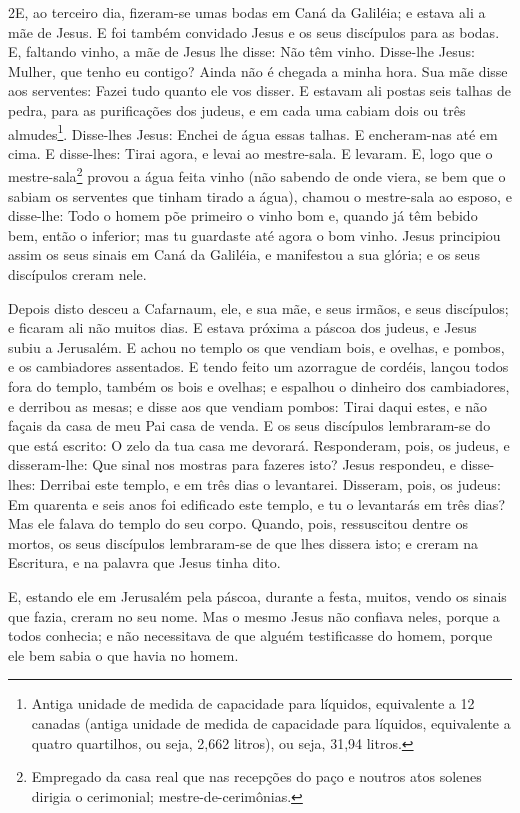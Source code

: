 \lettrine{2} E, ao terceiro dia, fizeram-se umas bodas em Caná
da Galiléia; e estava ali a mãe de Jesus. E foi também convidado
Jesus e os seus discípulos para as bodas. E, faltando vinho, a
mãe de Jesus lhe disse: Não têm vinho. Disse-lhe Jesus: Mulher,
que tenho eu contigo? Ainda não é chegada a minha hora. Sua mãe
disse aos serventes: Fazei tudo quanto ele vos disser. E estavam
ali postas seis talhas de pedra, para as purificações dos judeus, e
em cada uma cabiam dois ou três almudes\footnote{Antiga unidade de
medida de capacidade para líquidos, equivalente a 12 canadas (antiga
unidade de medida de capacidade para líquidos, equivalente a quatro
quartilhos, ou seja, 2,662 litros), ou seja, 31,94 litros.}.
Disse-lhes Jesus: Enchei de água essas talhas. E encheram-nas
até em cima. E disse-lhes: Tirai agora, e levai ao mestre-sala.
E levaram. E, logo que o mestre-sala\footnote{Empregado da casa
real que nas recepções do paço e noutros atos solenes dirigia o
cerimonial; mestre-de-cerimônias.} provou a água feita vinho (não
sabendo de onde viera, se bem que o sabiam os serventes que tinham
tirado a água), chamou o mestre-sala ao esposo, e disse-lhe:
Todo o homem põe primeiro o vinho bom e, quando já têm bebido bem,
então o inferior; mas tu guardaste até agora o bom vinho.
Jesus principiou assim os seus sinais em Caná da Galiléia, e
manifestou a sua glória; e os seus discípulos creram nele.

Depois disto desceu a Cafarnaum, ele, e sua mãe, e seus irmãos, e
seus discípulos; e ficaram ali não muitos dias. E estava
próxima a páscoa dos judeus, e Jesus subiu a Jerusalém. E
achou no templo os que vendiam bois, e ovelhas, e pombos, e os
cambiadores assentados. E tendo feito um azorrague de
cordéis, lançou todos fora do templo, também os bois e ovelhas; e
espalhou o dinheiro dos cambiadores, e derribou as mesas; e
disse aos que vendiam pombos: Tirai daqui estes, e não façais da
casa de meu Pai casa de venda. E os seus discípulos
lembraram-se do que está escrito: O zelo da tua casa me devorará.
Responderam, pois, os judeus, e disseram-lhe: Que sinal nos
mostras para fazeres isto? Jesus respondeu, e disse-lhes:
Derribai este templo, e em três dias o levantarei. Disseram,
pois, os judeus: Em quarenta e seis anos foi edificado este templo,
e tu o levantarás em três dias? Mas ele falava do templo do
seu corpo. Quando, pois, ressuscitou dentre os mortos, os
seus discípulos lembraram-se de que lhes dissera isto; e creram na
Escritura, e na palavra que Jesus tinha dito.

E, estando ele em Jerusalém pela páscoa, durante a festa, muitos,
vendo os sinais que fazia, creram no seu nome. Mas o mesmo
Jesus não confiava neles, porque a todos conhecia; e não
necessitava de que alguém testificasse do homem, porque ele bem
sabia o que havia no homem.

